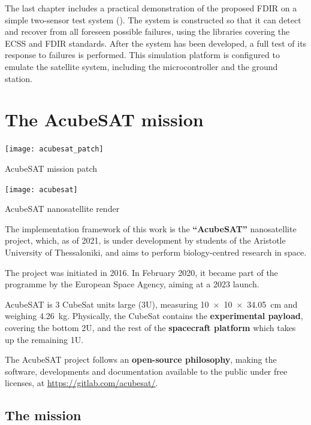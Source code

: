 \documentclass[a4paper,nobib]{tufte-book}
\begin{document}
The last chapter includes a practical demonstration of the proposed \acs{FDIR} on a simple two-sensor test system (). The system is constructed so that it can detect and recover from all foreseen possible failures, using the libraries covering the \acs{ECSS} and \acs{FDIR} standards. After the system has been developed, a full test of its response to failures is performed. This simulation platform is configured to emulate the satellite system, including the microcontroller and the ground station.

\chapter{The AcubeSAT mission}

\begin{marginfigure}
    \texttt{[image: acubesat\_patch]}
    \caption{AcubeSAT mission patch}
\end{marginfigure}

\begin{marginfigure}
    \centering
    \texttt{[image: acubesat]}
    \caption{AcubeSAT nanosatellite render}
\end{marginfigure}


The implementation framework of this work is the \textbf{``AcubeSAT''} nanosatellite project, which, as of 2021, is under development by students of the Aristotle University of Thessaloniki, and aims to perform biology-centred research in space.

The project was initiated in 2016. In February 2020, it became part of the  programme by the European Space Agency, aiming at a 2023 launch.

AcubeSAT is 3 CubeSat units large (3U), measuring \SI[product-units = single]{10 x 10 x 34.05}{\centi\metre} and weighing \SI{4.26}{\kilo\gram}. Physically, the CubeSat contains the \textbf{experimental payload}, covering the bottom 2U, and the rest of the \textbf{spacecraft platform} which takes up the remaining 1U.

The AcubeSAT project follows an \textbf{open-source philosophy}, making the software, developments and documentation available to the public under free licenses, at \url{https://gitlab.com/acubesat/}.

\section{The mission}
\end{document}
